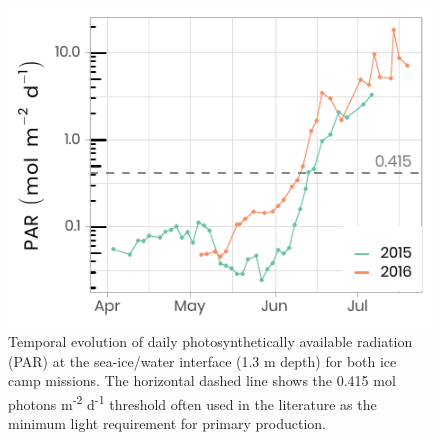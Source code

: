 \documentclass[12pt,a4paper]{scrartcl}
\begin{document}
\begin{figure}[h]
	\centering
	\includegraphics[scale = 1]{../../../graphs/fig05.pdf}
	\caption{Temporal evolution of daily photosynthetically available radiation (PAR) at the sea-ice/water interface (1.3 m depth) for both ice camp missions. The horizontal dashed line shows the 0.415 mol photons m\textsuperscript{-2} d\textsuperscript{-1} threshold often used in the literature as the minimum light requirement for primary production.}
\end{figure}

\clearpage
\newpage
\end{document}
